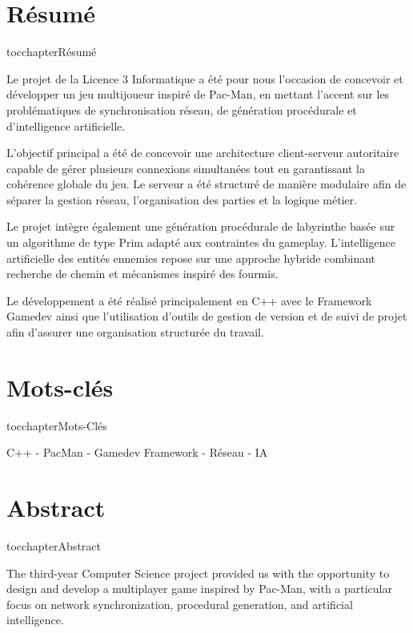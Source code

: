 \documentclass[a4paper, 11pt]{report}
\begin{document}
\newpage
\begin{center}
    \vspace*{\fill} %
    \section*{Résumé}
    \addcontentsline
    {toc}{chapter}{Résumé}
    \begin{justify}

        Le projet de la Licence 3 Informatique a été pour nous l’occasion de concevoir et développer un jeu multijoueur inspiré de Pac-Man, en mettant l’accent sur les problématiques de synchronisation réseau, de génération procédurale et d’intelligence artificielle.

        L’objectif principal a été de concevoir une architecture client-serveur autoritaire capable de gérer plusieurs connexions simultanées tout en garantissant la cohérence globale du jeu. Le serveur a été structuré de manière modulaire afin de séparer la gestion réseau, l’organisation des parties et la logique métier.

        Le projet intègre également une génération procédurale de labyrinthe basée sur un algorithme de type Prim adapté aux contraintes du gameplay. L’intelligence artificielle des entités ennemies repose sur une approche hybride combinant recherche de chemin et mécanismes inspiré des fourmis.

        Le développement a été réalisé principalement en C++ avec le Framework Gamedev ainsi que l’utilisation d’outils de gestion de version et de suivi de projet afin d’assurer une organisation structurée du travail.

    \end{justify}
    \vspace*{\fill} %

    \section*{Mots-clés}
    \addcontentsline
    {toc}{chapter}{Mots-Clés}
    \begin{center}
     C++ - PacMan - Gamedev Framework - Réseau - IA
    \end{center}
    \vspace*{\fill} %

    \section*{Abstract}
    \addcontentsline
    {toc}{chapter}{Abstract}
    \begin{justify}
The third-year Computer Science project provided us with the opportunity to design and develop a multiplayer game inspired by Pac-Man, with a particular focus on network synchronization, procedural generation, and artificial intelligence.


\end{justify}
\end{center}
\end{document}
